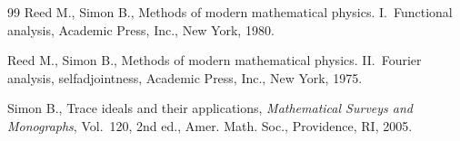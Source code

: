 \documentclass[11pt]{article}
\numberwithin{equation}{section}
\begin{document}
\begin{thebibliography}{99}
Reed M., Simon B., Methods of modern mathematical physics. {I}.~Functional
 analysis, Academic Press, Inc., New York, 1980.

Reed M., Simon B., Methods of modern mathematical physics. {II}.~Fourier
 analysis, selfadjointness, Academic Press, Inc., New York, 1975.

Simon B., Trace ideals and their applications, \textit{Mathematical Surveys and
 Monographs}, Vol.~120, 2nd ed., Amer. Math. Soc., Providence, RI, 2005.

\end{thebibliography}
\end{document}
